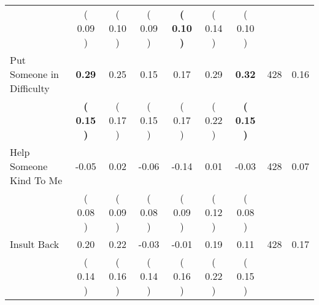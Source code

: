 \begin{tabular}{lcccccccc}
 & (     0.09 ) & (     0.10 ) & (     0.09 ) & \textbf{(     0.10 )} & (     0.14 ) & (     0.10 ) & \\
Put Someone in Difficulty & \textbf{     0.29} &      0.25 &      0.15 &      0.17 &      0.29 & \textbf{     0.32} & 428 &       0.16 \\ 
 & \textbf{(     0.15 )} & (     0.17 ) & (     0.15 ) & (     0.17 ) & (     0.22 ) & \textbf{(     0.15 )} & \\
Help Someone Kind To Me &     -0.05 &      0.02 &     -0.06 &     -0.14 &      0.01 &     -0.03 & 428 &       0.07 \\ 
 & (     0.08 ) & (     0.09 ) & (     0.08 ) & (     0.09 ) & (     0.12 ) & (     0.08 ) & \\
Insult Back &      0.20 &      0.22 &     -0.03 &     -0.01 &      0.19 &      0.11 & 428 &       0.17 \\ 
 & (     0.14 ) & (     0.16 ) & (     0.14 ) & (     0.16 ) & (     0.22 ) & (     0.15 ) & \\
\bottomrule
\end{tabular}
